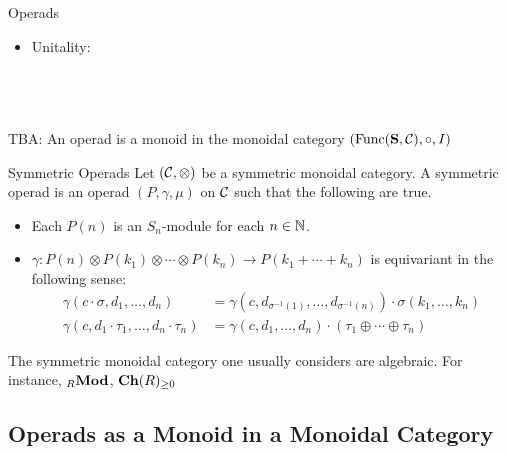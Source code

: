 \documentclass[a4paper]{article}
\begin{document}
\begin{defn}{Operads}{}
\begin{itemize}
{\begin{tikzcd}
\end{tikzcd}}\\~\\
\item Unitality: \\~\\
\\~\\
\end{itemize}
\end{defn}

TBA: An operad is a monoid in the monoidal category $(\text{Func}(\bold{S},\mC),\circ,I)$

\begin{defn}{Symmetric Operads}{} Let $(\mC,\otimes)$ be a symmetric monoidal category. A symmetric operad is an operad $(P,\gamma,\mu)$ on $\mC$ such that the following are true. 
\begin{itemize}
\item Each $P(n)$ is an $S_n$-module for each $n\in\N$. 
\item $\gamma:P(n)\otimes P(k_1)\otimes\cdots\otimes P(k_n)\to P(k_1+\cdots+k_n)$ is equivariant in the following sense: 
\begin{align*}
\gamma(c\cdot\sigma,d_1,\dots,d_n)&=\gamma(c,d_{\sigma^{-1}(1)},\dots,d_{\sigma^{-1}(n)})\cdot\sigma(k_1,\dots,k_n)\\
\gamma(c,d_1\cdot\tau_1,\dots,d_n\cdot\tau_n)&=\gamma(c,d_1,\dots,d_n)\cdot(\tau_1\oplus\cdots\oplus\tau_n)
\end{align*}
\end{itemize}
\end{defn}

The symmetric monoidal category one usually considers are algebraic. For instance, ${_R}\bold{Mod}$, $\bold{Ch}(R)_{\geq 0}$

\subsection{Operads as a Monoid in a Monoidal Category}
\end{document}
